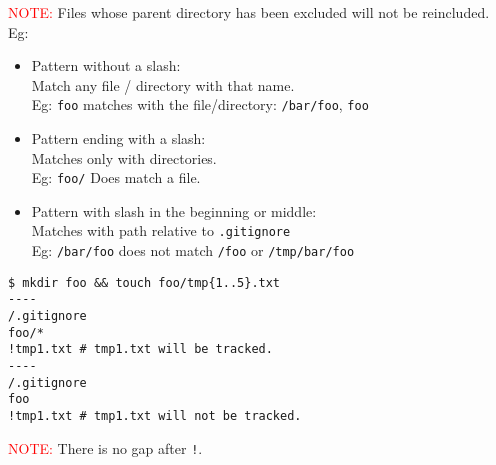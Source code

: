 \textcolor{red}{NOTE:} Files whose parent directory has been excluded will not be reincluded.\\
Eg:\\


\begin{itemize}
\item Pattern without a slash:\\
        Match any file / directory with that name.\\
        Eg: \texttt{foo} matches with the file/directory: \texttt{/bar/foo}, \texttt{foo}
\item Pattern ending with a slash:\\
        Matches only with directories.\\
        Eg: \texttt{foo/} Does match a file.\\
\item Pattern with slash in the beginning or middle:\\
        Matches with path relative to \texttt{.gitignore}\\
        Eg: \texttt{/bar/foo} does not match \texttt{/foo} or \texttt{/tmp/bar/foo}\\
\end{itemize}


\begin{mdframed}[backgroundcolor=gray!10,linecolor=Firebrick4]
\begin{verbatim}
$ mkdir foo && touch foo/tmp{1..5}.txt 
----
/.gitignore
foo/*
!tmp1.txt # tmp1.txt will be tracked.
----
/.gitignore
foo
!tmp1.txt # tmp1.txt will not be tracked.
\end{verbatim}
\end{mdframed}
\textcolor{red}{NOTE:} There is no gap after \texttt{!}.\\



\vfill \null
\pagebreak

